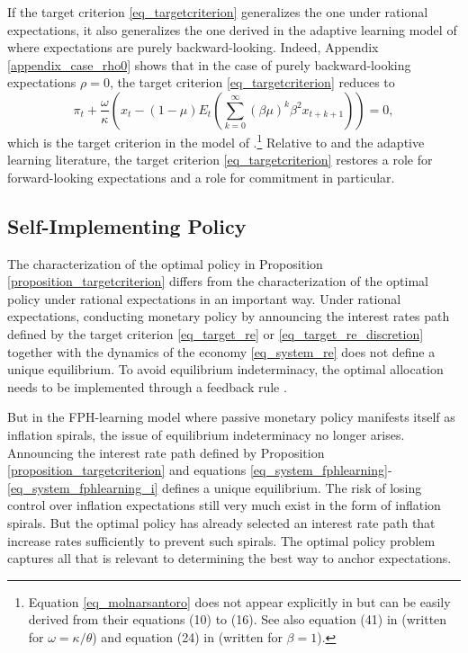 \documentclass{article}
\begin{document}
If the target criterion \eqref{eq_targetcriterion} generalizes the one under rational expectations, it also generalizes the one derived in the adaptive learning model of \cite{MolnarSantoro2014} where expectations are purely backward-looking. Indeed, Appendix \ref{appendix_case_rho0} shows that in the case of purely backward-looking expectations $\rho=0$, the target criterion \eqref{eq_targetcriterion} reduces to
\begin{equation}
\pi_t + \frac{\omega}{\kappa} \left(x_t - (1-\mu) E_t\left(\sum_{k=0}^{\infty} (\beta\mu)^{k} \beta^2 x_{t+k+1}\right)\right)=0,\label{eq_molnarsantoro}
\end{equation}
which is the target criterion in the model of \cite{MolnarSantoro2014}.\footnote{Equation \eqref{eq_molnarsantoro} does not appear explicitly in \cite{MolnarSantoro2014} but can be easily derived from their equations (10) to (16). See also equation (41) in \cite{EusepiPrestonJEL} (written for $\omega = \kappa/\theta$) and equation (24) in \cite{GasparSmetsVestin2010} (written for $\beta=1$).} Relative to \cite{MolnarSantoro2014} and the adaptive learning literature, the target criterion \eqref{eq_targetcriterion} restores a role for forward-looking expectations and a role for commitment in particular.

\subsection{Self-Implementing Policy}
The characterization of the optimal policy in Proposition \ref{proposition_targetcriterion} differs from the characterization of the optimal policy under rational expectations in an important way. Under rational expectations, conducting monetary policy by announcing the interest rates path defined by the target criterion \eqref{eq_target_re} or \eqref{eq_target_re_discretion} together with the dynamics of the economy \eqref{eq_system_re} does not define a unique equilibrium. To avoid equilibrium indeterminacy, the optimal allocation needs to be implemented through a feedback rule \citep{GiannoniWoodford2003}.

But in the FPH-learning model where passive monetary policy manifests itself as inflation spirals, the issue of equilibrium indeterminacy no longer arises. Announcing the interest rate path defined by Proposition \ref{proposition_targetcriterion} and equations \eqref{eq_system_fphlearning}-\eqref{eq_system_fphlearning_i} defines a unique equilibrium. The risk of losing control over inflation expectations still very much exist in the form of inflation spirals. But the optimal policy has already selected an interest rate path that increase rates sufficiently to prevent such spirals. The optimal policy problem captures all that is relevant to determining the best way to anchor expectations.
\end{document}
